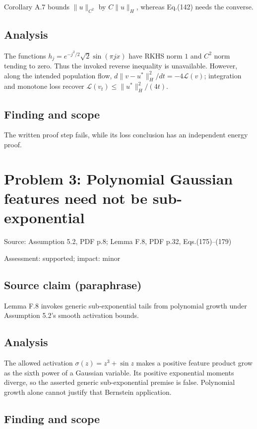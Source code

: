 \documentclass[11pt]{article}
\begin{document}
Corollary A.7 bounds \(\|u\|_{C^2}\) by \(C\|u\|_H\), whereas Eq.(142) needs the converse.

\subsection*{Analysis}

The functions \(h_j=e^{-j^2/2}\sqrt2\sin(\pi jx)\) have RKHS norm \(1\) and \(C^2\) norm tending to zero. Thus the invoked reverse inequality is unavailable. However, along the intended population flow, \(d\|v-u^*\|_H^2/dt=-4\mathcal L(v)\); integration and monotone loss recover \(\mathcal L(v_t)\leq\|u^*\|_H^2/(4t)\).

\subsection*{Finding and scope}

The written proof step fails, while its loss conclusion has an independent energy proof.

\section*{Problem 3: Polynomial Gaussian features need not be sub-exponential}

Source: Assumption 5.2, PDF p.8; Lemma F.8, PDF p.32, Eqs.(175)–(179)

Assessment: supported; impact: minor

\subsection*{Source claim (paraphrase)}

Lemma F.8 invokes generic sub-exponential tails from polynomial growth under Assumption 5.2’s smooth activation bounds.

\subsection*{Analysis}

The allowed activation \(\sigma(z)=z^3+\sin z\) makes a positive feature product grow as the sixth power of a Gaussian variable. Its positive exponential moments diverge, so the asserted generic sub-exponential premise is false. Polynomial growth alone cannot justify that Bernstein application.

\subsection*{Finding and scope}
\end{document}
